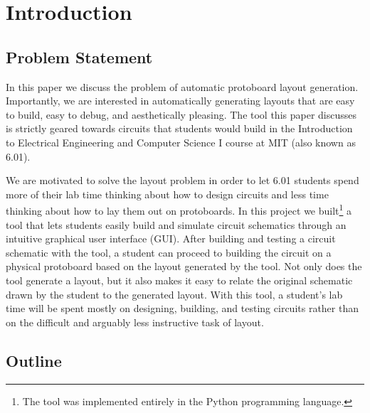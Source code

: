 

\chapter{Introduction}
\label{ch:intro}

\section{Problem Statement}

In this paper we discuss the problem of automatic protoboard layout generation.
Importantly, we are interested in automatically generating layouts that are
easy to build, easy to debug, and aesthetically pleasing. The tool this
paper discusses
is strictly geared towards circuits that students would build in the
Introduction to Electrical Engineering and Computer Science I\cite{sixohone} 
course at MIT (also known as 6.01).

We are motivated to solve the layout
problem in order to let 6.01 students spend more of their lab time thinking
about how to design
circuits and less time thinking about how to lay them out on protoboards.
In this project we built\footnote{The tool was implemented entirely in the
Python programming language.}
a tool that lets students easily build and
simulate circuit schematics through an intuitive graphical user interface (GUI).
After building and testing a circuit schematic with the tool, a student can
proceed to building the circuit on a physical protoboard based on the layout
generated by the tool. Not only does the tool generate a layout, but it
also makes it easy to relate the original schematic drawn by the student to the
generated layout. With this tool, a student's lab time will be spent mostly
on designing, building, and testing circuits rather than on the difficult and
arguably less instructive task of layout.

\section{Outline}

